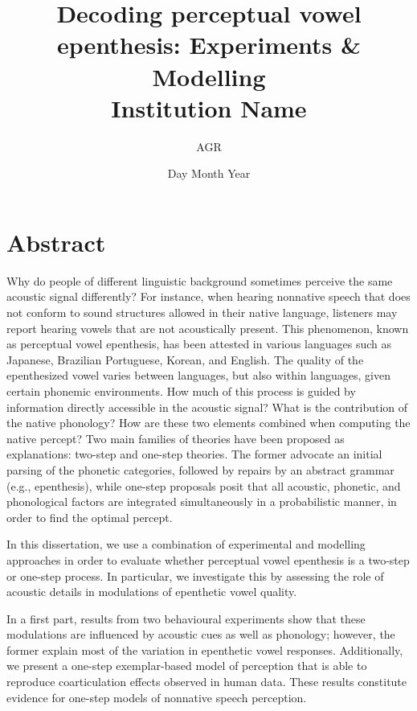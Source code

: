 \documentclass[12pt, twoside]{report}
\title{
	{Decoding perceptual vowel epenthesis: Experiments \& Modelling}\\
	{\large Institution Name}\\
}
\author{AGR}
\date{Day Month Year}
\begin{document}
\maketitle

\chapter*{Abstract}
Why do people of different linguistic background sometimes perceive the same acoustic signal differently? For instance, when hearing nonnative speech that does not conform to sound structures allowed in their native language, listeners may report hearing vowels that are not acoustically present. This phenomenon, known as perceptual vowel epenthesis, has been attested in various languages such as Japanese, Brazilian Portuguese, Korean, and English. The quality of the epenthesized vowel varies between languages, but also within languages, given certain phonemic environments. 
How much of this process is guided by information directly accessible in the acoustic signal? What is the contribution of the native phonology? How are these two elements combined when computing the native percept? Two main families of theories have been proposed as explanations: two-step and one-step theories. The former advocate an initial parsing of the phonetic categories, followed by repairs by an abstract grammar (e.g., epenthesis), while one-step proposals posit that all acoustic, phonetic, and phonological factors are integrated simultaneously in a probabilistic manner, in order to find the optimal percept.  

In this dissertation, we use a combination of experimental and modelling approaches in order to evaluate whether perceptual vowel epenthesis is a two-step or one-step process. In particular, we investigate this by assessing the role of acoustic details in modulations of epenthetic vowel quality.

In a first part, results from two behavioural experiments show that these modulations are influenced by acoustic cues as well as phonology; however, the former explain most of the variation in epenthetic vowel responses. Additionally, we present a one-step exemplar-based model of perception that is able to reproduce coarticulation effects observed in human data. These results constitute evidence for one-step models of nonnative speech perception.
\end{document}
